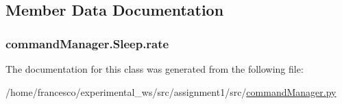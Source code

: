 \subsection{Member Data Documentation}
\subsubsection[{\texorpdfstring{rate}{rate}}]{\setlength{\rightskip}{0pt plus 5cm}command\+Manager.\+Sleep.\+rate}\hypertarget{classcommandManager_1_1Sleep_ad1bca2bd2c57109d92089b82fafe23c1}{}\label{classcommandManager_1_1Sleep_ad1bca2bd2c57109d92089b82fafe23c1}


The documentation for this class was generated from the following file\+:\begin{DoxyCompactItemize}
\item 
/home/francesco/experimental\+\_\+ws/src/assignment1/src/\hyperlink{commandManager_8py}{command\+Manager.\+py}\end{DoxyCompactItemize}
